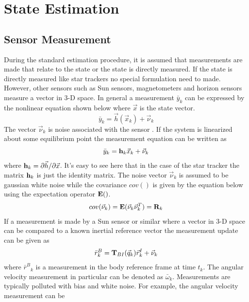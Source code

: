 \documentclass{article}
\begin{document}
\section{State Estimation}

\subsection{Sensor Measurement} \label{s:measurements}

During the standard estimation procedure, it is assumed that
measurements are made that relate to the state or the state is
directly measured. If the state is directly measured like star trackers no special formulation need to
made. However, other sensors such as Sun sensors, magnetometers and
horizon sensors measure a vector in 3-D space. In general a
measurement $\bar{y}_k$ can be expressed by the nonlinear equation
shown below where $\vec{x}$ is the state vector. 
\begin{equation}
  \bar{y}_k = \vec{h}(\vec{x}_k) + \vec{\nu}_k
\end{equation}
The vector $\vec{\nu}_k$ is noise associated with the sensor
\cite{Munoz,cassidis}. If the system is linearized about some
equilibrium point the measurement equation can be written as
\begin{equation}
  \bar{y}_k = {\bf h}_k\vec{x}_k + \vec{\nu}_k
\end{equation}
where ${\bf h}_k = \partial \vec{h}/\partial \vec{x}$. 
It's easy to see here that in the case of the star tracker the matrix
${\bf h}_k$ is just the identity matrix. The noise vector
$\vec{\nu}_k$ is assumed to be gaussian white noise while the
covariance $cov()$ is given by the equation below using the
expectation operator ${\bf E}()$.
\begin{equation}
  cov(\vec{\nu}_k) = {\bf E}(\vec{\nu}_k\vec{\nu}_k^T) = {\bf R}_k
\end{equation}
If a measurement is made by a
Sun sensor or similar where a vector in 3-D space can be compared to a
known inertial reference vector the measurement update can be given as 
\begin{equation}
  {\bar{r}^B}_k = {\bf T}_{BI}(\vec{q}_k){\vec{r}^I}_k + \vec{\nu}_k
\end{equation}
where ${\bar{r}^B}_k$ is a measurement in the body reference frame at
time $t_k$. The angular velocity measurement in particular can be denoted as
$\bar{\omega}_k$. Measurements are typically polluted with bias and
white noise. For example, the angular velocity measurement can be
\end{document}
